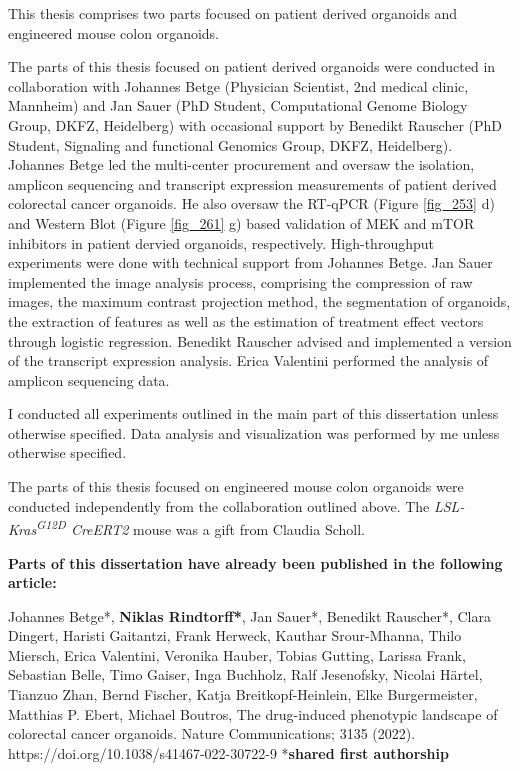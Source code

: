 \begin{flushleft}
This thesis comprises two parts focused on patient derived organoids and engineered mouse colon organoids. 
\bigbreak

The parts of this thesis focused on patient derived organoids were conducted in collaboration with Johannes Betge (Physician Scientist, 2nd medical clinic, Mannheim) and Jan Sauer (PhD Student, Computational Genome Biology Group, DKFZ, Heidelberg) with occasional support by Benedikt Rauscher (PhD Student, Signaling and functional Genomics Group, DKFZ, Heidelberg). 
\smallbreak
Johannes Betge led the multi-center procurement and oversaw the isolation, amplicon sequencing and transcript expression measurements of patient derived colorectal cancer organoids. He also oversaw the RT-qPCR (Figure \ref{fig_253} d) and Western Blot (Figure \ref{fig_261} g) based validation of MEK and mTOR inhibitors in patient dervied organoids, respectively. High-throughput experiments were done with technical support from Johannes Betge. 
\smallbreak
Jan Sauer implemented the image analysis process, comprising the compression of raw images, the maximum contrast projection method, the segmentation of organoids, the extraction of features as well as the estimation of treatment effect vectors through logistic regression. 
\smallbreak
Benedikt Rauscher advised and implemented a version of the transcript expression analysis. 
\smallbreak
Erica Valentini performed the analysis of amplicon sequencing data. \par
I conducted all experiments outlined in the main part of this dissertation unless otherwise specified. Data analysis and visualization was performed by me unless otherwise specified. 
\bigbreak

The parts of this thesis focused on engineered mouse colon organoids were conducted independently from the collaboration outlined above. The \textit{LSL-Kras\textsuperscript{G12D} CreERT2} mouse was a gift from Claudia Scholl.
\bigbreak

\textbf{Parts of this dissertation have already been published in the following article:}
\bigbreak

Johannes Betge*, \textbf{Niklas Rindtorff*}, Jan Sauer*, Benedikt Rauscher*, Clara Dingert, Haristi Gaitantzi, Frank Herweck, Kauthar Srour-Mhanna, Thilo Miersch, Erica Valentini, Veronika Hauber, Tobias Gutting, Larissa Frank, Sebastian Belle, Timo Gaiser, Inga Buchholz, Ralf Jesenofsky, Nicolai Härtel, Tianzuo Zhan, Bernd Fischer, Katja Breitkopf-Heinlein, Elke Burgermeister, Matthias P. Ebert, Michael Boutros, The drug-induced phenotypic landscape of colorectal cancer organoids. Nature Communications; 3135 (2022). https://doi.org/10.1038/s41467-022-30722-9 *\textbf{shared first authorship}


\end{flushleft}
